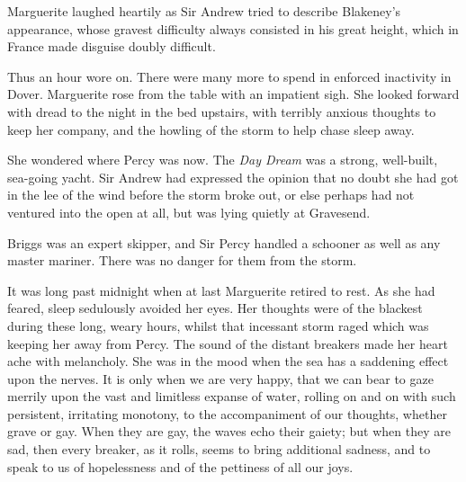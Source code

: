 Marguerite laughed heartily as Sir Andrew tried to describe Blakeney's appearance, whose gravest difficulty always consisted in his great height, which in France made disguise doubly difficult.

Thus an hour wore on. There were many more to spend in enforced inactivity in Dover. Marguerite rose from the table with an impatient sigh. She looked forward with dread to the night in the bed upstairs, with terribly anxious thoughts to keep her company, and the howling of the storm to help chase sleep away.

She wondered where Percy was now. The \textit{Day Dream} was a strong, well-built, sea-going yacht. Sir Andrew had expressed the opinion that no doubt she had got in the lee of the wind before the storm broke out, or else perhaps had not ventured into the open at all, but was lying quietly at Gravesend.

Briggs was an expert skipper, and Sir Percy handled a schooner as well as any master mariner. There was no danger for them from the storm.

It was long past midnight when at last Marguerite retired to rest. As she had feared, sleep sedulously avoided her eyes. Her thoughts were of the blackest during these long, weary hours, whilst that incessant storm raged which was keeping her away from Percy. The sound of the distant breakers made her heart ache with melancholy. She was in the mood when the sea has a saddening effect upon the nerves. It is only when we are very happy, that we can bear to gaze merrily upon the vast and limitless expanse of water, rolling on and on with such persistent, irritating monotony, to the accompaniment of our thoughts, whether grave or gay. When they are gay, the waves echo their gaiety; but when they are sad, then every breaker, as it rolls, seems to bring additional sadness, and to speak to us of hopelessness and of the pettiness of all our joys.